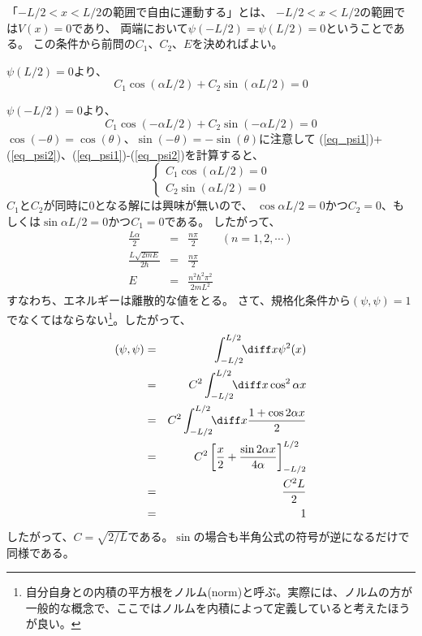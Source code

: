 「$-L/2<  x < L/2$の範囲で自由に運動する」とは、
$-L/2<  x < L/2$の範囲では$V(x)=0$であり、
両端において$\psi(-L/2) = \psi(L/2) = 0$ということである。
この条件から前問の$C_1$、$C_2$、$E$を決めればよい。

$\psi(L/2) = 0$より、
\begin{equation}
  C_1 \cos{(\alpha L/2)} + C_2 \sin{(\alpha L/2)} = 0  \label{eq_psi1}
\end{equation}

$\psi(-L/2) = 0$より、
\begin{equation}
  C_1 \cos{(-\alpha L/2)} + C_2 \sin{(-\alpha L/2)} = 0 \label{eq_psi2}
\end{equation}
$\cos(-\theta) = \cos(\theta)$、$\sin(-\theta) = -\sin(\theta)$に注意して
(\ref{eq_psi1})+(\ref{eq_psi2})、(\ref{eq_psi1})-(\ref{eq_psi2})を計算すると、
\begin{equation}
  \left\{
  \begin{array}{c}
    C_1 \cos{(\alpha L/2)} = 0 \\
    C_2 \sin{(\alpha L/2)} = 0
  \end{array}
  \right.
\end{equation}
$C_1$と$C_2$が同時に$0$となる解には興味が無いので、
$\cos{\alpha L/2} = 0 $かつ$C_2=0$、もしくは$\sin{\alpha L/2} = 0 $かつ$C_1=0$である。
したがって、
\begin{eqnarray}
  \frac{L \alpha }{2} &=& \frac{n\pi}{2} \qquad (n = 1,2,\cdots)\\
  \frac{L \sqrt{2mE}}{2\hbar} &=& \frac{n\pi}{2} \\
  E &=& \frac{n^2 \hbar^2 \pi^2}{2mL^2}
\end{eqnarray}
すなわち、エネルギーは離散的な値をとる。
さて、規格化条件から$(\psi,\psi) = 1$でなくてはならない\footnote{%
  自分自身との内積の平方根をノルム(norm)と呼ぶ。実際には、ノルムの方が
  一般的な概念で、ここではノルムを内積によって定義していると考えたほうが良い。
}。したがって、
\begin{eqnarray*}
  (\psi,\psi) &=& \int_{-L/2}^{L/2} \!\! \diff x \psi^2(x) \\
  &=&  C^2 \int_{-L/2}^{L/2} \!\! \diff x \cos^2{\alpha x} \\
  &=& C^2 \int_{-L/2}^{L/2} \!\! \diff x \frac{1+\cos 2\alpha x}{2} \\
  &=& C^2 \left[ \frac{x}{2} +  \frac{\sin 2 \alpha x}{4 \alpha} \right]_{-L/2}^{L/2} \\
  &=& \frac{C^2 L}{2} \\
  &=& 1
\end{eqnarray*}
したがって、$C = \sqrt{2/L}$である。$\sin$の場合も半角公式の符号が逆になるだけで同様である。

